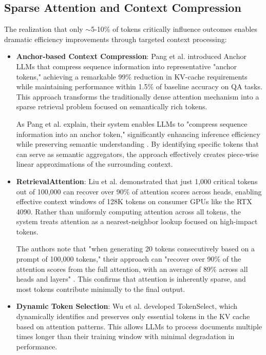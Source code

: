\documentclass{article}
\begin{document}
\subsection{Sparse Attention and Context Compression}

The realization that only $\sim$5-10\% of tokens critically influence outcomes enables dramatic efficiency improvements through targeted context processing:

\begin{itemize}
\item \textbf{Anchor-based Context Compression}: Pang et al. \citep{pang2024anchor} introduced Anchor LLMs that compress sequence information into representative "anchor tokens," achieving a remarkable 99\% reduction in KV-cache requirements while maintaining performance within 1.5\% of baseline accuracy on QA tasks. This approach transforms the traditionally dense attention mechanism into a sparse retrieval problem focused on semantically rich tokens.

  As Pang et al. explain, their system enables LLMs to "compress sequence information into an anchor token," significantly enhancing inference efficiency while preserving semantic understanding \citep{pang2024anchor}. By identifying specific tokens that can serve as semantic aggregators, the approach effectively creates piece-wise linear approximations of the surrounding context.

\item \textbf{RetrievalAttention}: Liu et al. \citep{liu2024retrieval} demonstrated that just 1,000 critical tokens out of 100,000 can recover over 90\% of attention scores across heads, enabling effective context windows of 128K tokens on consumer GPUs like the RTX 4090. Rather than uniformly computing attention across all tokens, the system treats attention as a nearest-neighbor lookup focused on high-impact tokens.

  The authors note that "when generating 20 tokens consecutively based on a prompt of 100,000 tokens," their approach can "recover over 90\% of the attention scores from the full attention, with an average of 89\% across all heads and layers" \citep{liu2024retrieval}. This confirms that attention is inherently sparse, and most tokens contribute minimally to the final output.

\item \textbf{Dynamic Token Selection}: Wu et al. \citep{wu2024tokenselect} developed TokenSelect, which dynamically identifies and preserves only essential tokens in the KV cache based on attention patterns. This allows LLMs to process documents multiple times longer than their training window with minimal degradation in performance.
\end{itemize}
\end{document}
